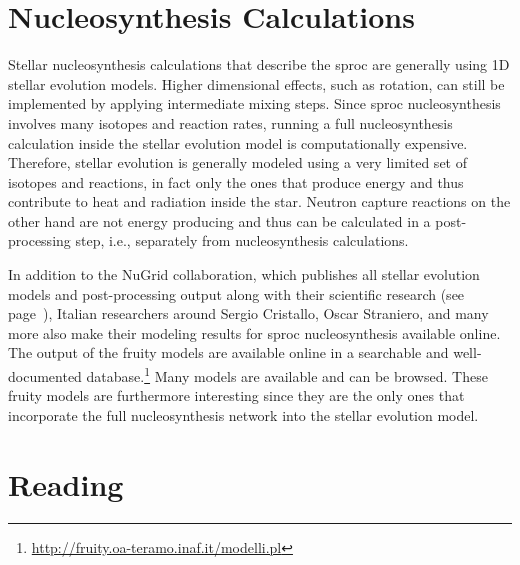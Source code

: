 \section{Nucleosynthesis Calculations}

Stellar nucleosynthesis calculations that describe the \ac{sproc} are generally using 1D stellar evolution models. Higher dimensional effects, such as rotation, can still be implemented by applying intermediate mixing steps. Since \ac{sproc} nucleosynthesis involves many isotopes and reaction rates, running a full nucleosynthesis calculation inside the stellar evolution model is computationally expensive. Therefore, stellar evolution is generally modeled using a very limited set of isotopes and reactions, in fact only the ones that produce energy and thus contribute to heat and radiation inside the star. Neutron capture reactions on the other hand are not energy producing and thus can be calculated in a post-processing step, i.e., separately from nucleosynthesis calculations.

In addition to the NuGrid collaboration, which publishes all stellar evolution models and post-processing output along with their scientific research (see page~\pageref{codebox:nugrid}), Italian researchers around Sergio Cristallo, Oscar Straniero, and many more also make their modeling results for \ac{sproc} nucleosynthesis available online. The output of the \ac{fruity} models are available online in a searchable and well-documented database.\footnote{\url{http://fruity.oa-teramo.inaf.it/modelli.pl}} Many models are available and can be browsed. These \ac{fruity} models are furthermore interesting since they are the only ones that incorporate the full nucleosynthesis network into the stellar evolution model. 


\section{Reading}

